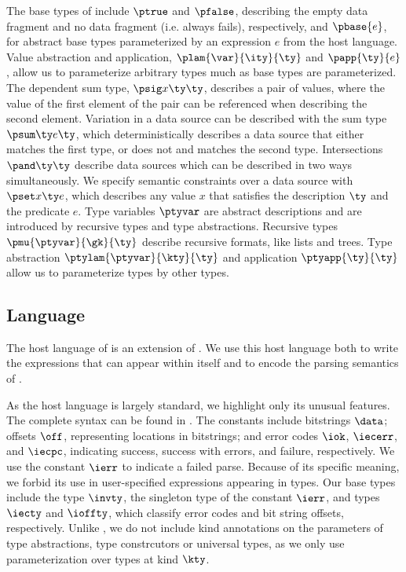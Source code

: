 The base types of \ddc{} include $\ptrue$ and $\pfalse$, describing
the empty data fragment and no data fragment (i.e. always fails),
respectively, and $\pbase{e}$, for abstract base types parameterized
by an expression $e$ from the host language. Value abstraction and
application, $\plam{\var}{\ity}{\ty}$ and $\papp{\ty}{e}$, allow us to
parameterize arbitrary types much as base types are parameterized. The
dependent sum type, $\psig x \ty \ty$, describes a pair of values,
where the value of the first element of the pair can be referenced
when describing the second element.  Variation in a data source can be
described with the sum type $\psum \ty e \ty$, which deterministically
describes a data source that either matches the first type, or does
not and matches the second type.  Intersections $\pand \ty \ty$
describe data sources which can be described in two ways
simultaneously. We specify semantic constraints over a data source
with $\pset x \ty e$, which describes any value $x$ that satisfies the
description $\ty$ and the predicate $e$. Type variables $\ptyvar$ are
abstract descriptions and are introduced by recursive types and type
abstractions. Recursive types $\pmu{\ptyvar}{\gk}{\ty}$ describe
recursive formats, like lists and trees. Type abstraction
$\ptylam{\ptyvar}{\kty}{\ty}$ and application $\ptyapp{\ty}{\ty}$
allow us to parameterize types by other types.

\subsection{\Implang{} Language}
\label{sec:host-lang}

The host language of \ddc{} is an extension of \fomega.  We use this
host language both to write the expressions that can appear within
\ddc{} itself and to encode the parsing semantics of \ddc{}.

As the host language is largely standard, we highlight only its
unusual features. The complete syntax can be found in .
The constants include bitstrings $\data$; offsets $\off$, representing
locations in bitstrings; and error codes $\iok$, $\iecerr$, and
$\iecpc$, indicating success, success with errors, and failure,
respectively. We use the constant $\ierr$ to indicate a failed parse.
Because of its specific meaning, we forbid its use in user-specified
expressions appearing in \ddc{} types.
Our base types include the type $\invty$, the singleton type of the
constant $\ierr$, and types $\iecty$ and $\ioffty$, which classify
error codes and bit string offsets, respectively.
Unlike \fomega, we do not include kind annotations on the parameters
of type abstractions, type constrcutors or universal types, as we only
use parameterization over types at kind $\kty$.

